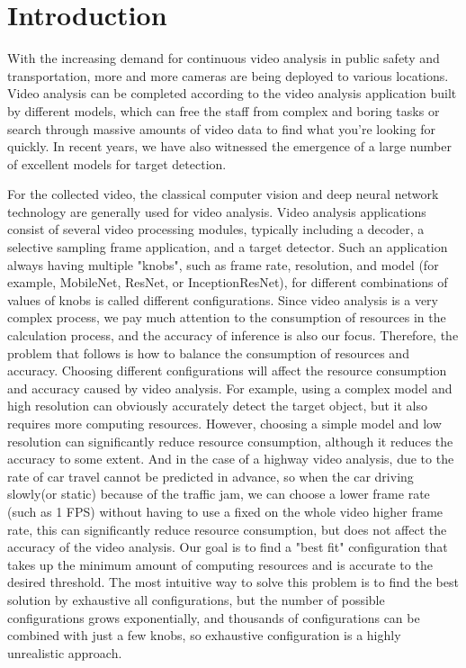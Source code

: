 \section{Introduction}
\label{Section: introduction}
With the increasing demand for continuous video analysis in public safety and transportation, more and more cameras are being deployed to various locations. Video analysis can be completed according to the video analysis application built by different models, which can free the staff from complex and boring tasks or search through massive amounts of video data to find what you're looking for quickly. In recent years, we have also witnessed the emergence of a large number of excellent models for target detection.  \cite{jiang2018chameleon}

For the collected video, the classical computer vision and deep neural network technology are generally used for video analysis. Video analysis applications consist of several video processing modules, typically including a decoder, a selective sampling frame application, and a target detector. Such an application always having multiple "knobs", such as frame rate, resolution, and model (for example, MobileNet, ResNet, or InceptionResNet), for different combinations of values of knobs is called different configurations. Since video analysis is a very complex process, we pay much attention to the consumption of resources in the calculation process, and the accuracy of inference is also our focus. Therefore, the problem that follows is how to balance the consumption of resources and accuracy. Choosing different configurations will affect the resource consumption and accuracy caused by video analysis. For example, using a complex model and high resolution can obviously accurately detect the target object, but it also requires more computing resources. However, choosing a simple model and low resolution can significantly reduce resource consumption, although it reduces the accuracy to some extent. And in the case of a highway video analysis, due to the rate of car travel cannot be predicted in advance, so when the car driving slowly(or static) because of the traffic jam, we can choose a lower frame rate (such as 1 FPS) without having to use a fixed on the whole video higher frame rate, this can significantly reduce resource consumption, but does not affect the accuracy of the video analysis. Our goal is to find a "best fit" configuration that takes up the minimum amount of computing resources and is accurate to the desired threshold. The most intuitive way to solve this problem is to find the best solution by exhaustive all configurations, but the number of possible configurations grows exponentially, and thousands of configurations can be combined with just a few knobs, so exhaustive configuration is a highly unrealistic approach.

